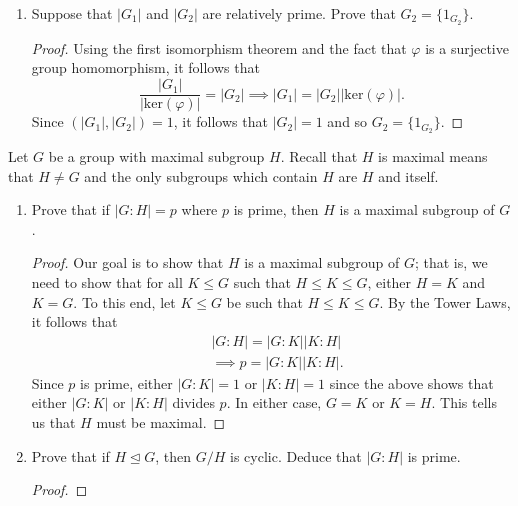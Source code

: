 \documentclass[a4paper]{article}
\begin{document}
\begin{problem}
\begin{enumerate}
        \item[(c)] Suppose that \( | {G}_{1} |   \) and \( | {G}_{2}  |  \) are relatively prime. Prove that \( {G}_{2} = \{ {1}_{G_2} \}  \). 
            \begin{proof}
            Using the first isomorphism theorem and the fact that \( \varphi  \) is a surjective group homomorphism, it follows that   
            \[ \frac{ | {G}_{1} |  }{ | \text{ker}(\varphi)  |  }  = | {G}_{2} |  \implies | {G}_{1} |  = | {G}_{2} | | \text{ker}(\varphi)  |. \]
            Since \( (| {G}_{1} | , | {G}_{2} | ) = 1 \), it follows that \( | {G}_{2} |  = 1  \) and so \( {G}_{2} = \{ {1}_{{G}_{2}} \}  \).
            \end{proof}
    \end{enumerate}
\end{problem}
\begin{problem}
    Let \( G  \) be a group with maximal subgroup \( H \). Recall that \( H  \) is maximal means that \( H \neq G  \) and the only subgroups which contain \( H \) are \( H \) and itself.
    \begin{enumerate}
        \item[(a)] Prove that if \( | G : H  |  = p  \) where \( p  \) is prime, then \( H \) is a maximal subgroup of \( G  \).  
            \begin{proof}
            Our goal is to show that \( H  \) is a maximal subgroup of \( G  \); that is, we need to show that for all \( K \leq G  \) such that \( H \leq K \leq G  \), either \( H = K   \) and \( K = G  \). To this end, let \( K \leq G  \) be such that \( H \leq K \leq G  \). By the Tower Laws, it follows that   
            \begin{align*}
                &| G : H  |  = | G : K  |  | K : H  | \\ 
                &\implies p = | G : K  |  | K  : H |. 
            \end{align*}
            Since \( p \) is prime, either \( | G : K  |  = 1     \) or \( | K : H  |  = 1  \) since the above shows that either \( | G :  K  |  \) or \( | K :  H |  \) divides \( p  \). In either case, \( G = K   \) or \( K =  H \). This tells us that \( H  \) must be maximal.
            \end{proof}
        \item[(b)] Prove that if \( H \trianglelefteq G  \), then \( G / H  \) is cyclic. Deduce that \( | G : H  |  \) is prime.
            \begin{proof}

\end{proof}
\end{enumerate}
\end{problem}
\end{document}
